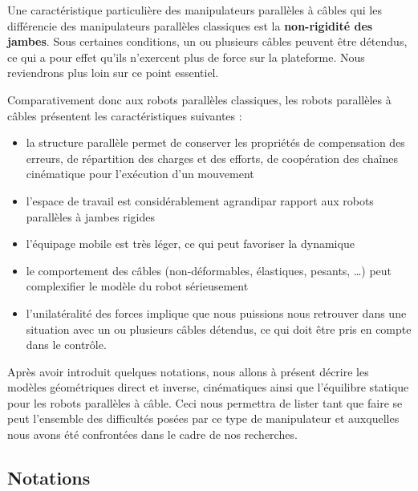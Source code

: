 Une caractéristique particulière des manipulateurs parallèles à câbles qui les différencie des manipulateurs parallèles classiques est la {\bf non-rigidité des jam\-bes}. Sous certaines conditions, un ou plusieurs câbles peuvent être détendus, ce qui a pour effet qu'ils n'exercent plus de force sur la plateforme. Nous reviendrons plus loin sur ce point essentiel.

Comparativement donc aux robots parallèles classiques, les robots parallèles à câbles présentent les caractéristiques suivantes :
\begin{itemize}
 \item la structure parallèle permet de conserver les propriétés de compensation des erreurs, de répartition des charges et des efforts, de coopération des chaînes cinématique pour l'exécution d'un mouvement
 \item l'espace de travail est considérablement agrandipar rapport aux robots parallèles à jambes rigides
 \item l'équipage mobile est très léger, ce qui peut favoriser la dynamique
 \item le comportement des câbles (non-déformables, élastiques, pesants, \dots) peut complexifier le modèle du robot sérieusement
 \item l'unilatéralité des forces implique que nous puissions nous retrouver dans une situation avec un ou plusieurs câbles détendus, ce qui doit être pris en compte dans le contrôle.
\end{itemize}

Après avoir introduit quelques notations, nous allons à présent décrire les modèles géométriques direct et inverse, cinématiques ainsi que l'équilibre statique pour les robots parallèles à câble. Ceci nous permettra de lister tant que faire se peut l'ensemble des difficultés posées par ce type de manipulateur et auxquelles nous avons été confrontées dans le cadre de nos recherches.

\subsection{Notations}

\begin{figure}[!ht]
\centering
\def\svgwidth{.85\linewidth}

\end{figure}


